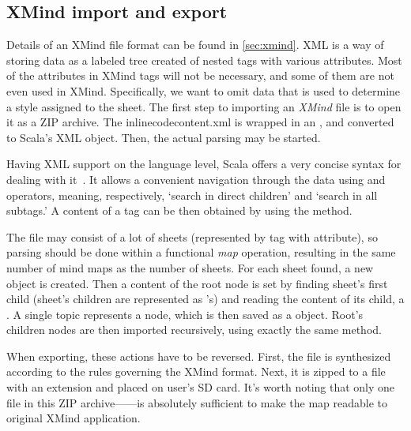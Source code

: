 %
%
%
%
%

\subsection{XMind import and export}
\label{subsec:xmind-exchange}

Details of an XMind file format can be found in \cref{sec:xmind}. XML is a way of storing data as a labeled tree created of nested tags with various attributes. Most of the attributes in  XMind tags will not be necessary, and some of them are not even used in XMind. Specifically, we want to omit data that is used to determine a style assigned to the sheet. The first step to importing an {\em XMind} file is to open it as a ZIP archive. The inlinecode{content.xml} is wrapped in an , and converted to Scala's XML object. Then, the actual parsing may be started.

Having XML support on the language level, Scala offers a very concise syntax for dealing with it~\cite{Odersky:2008:Programming}. It allows a convenient navigation through the data using \inlinecode{\textbackslash} and \inlinecode{\textbackslash\textbackslash} operators, meaning, respectively, `search in direct children' and `search in all subtags.' A content of a tag can be then obtained by using the  method.

The  file may consist of a lot of sheets (represented by  tag with  attribute), so parsing should be done within a functional \emph{map} operation, resulting in the same number of mind maps as the number of sheets. For each sheet found, a new  object is created. Then a content of the root node is set by finding sheet's first child (sheet's children are represented as 's) and reading the content of its child, a . A single topic represents a node, which is then saved as a  object. Root's children nodes are then imported recursively, using exactly the same method.

When exporting, these actions have to be reversed. First, the  file is synthesized according to the rules governing the XMind format. Next, it is zipped to a file with an  extension and placed on user's SD card. It's worth noting that only one file in this ZIP archive------is absolutely sufficient to make the map readable to original XMind application.
